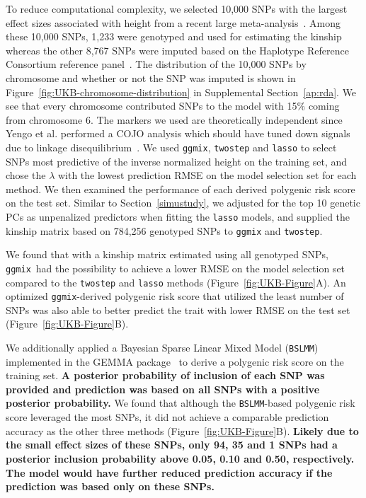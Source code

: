 \documentclass[12pt,letter]{article}\usepackage[]{graphicx}\usepackage[]{color}
\newcommand{\ggmix}{\texttt{ggmix}}
\begin{document}
To reduce computational complexity, we selected 10,000 SNPs with the largest effect sizes associated with height from a recent large meta-analysis~\citep{yengo2018meta}. Among these 10,000 SNPs, 1,233 were genotyped and used for estimating the kinship whereas the other 8,767 SNPs were imputed based on the Haplotype Reference Consortium reference panel~\citep{mccarthy2016reference}. The distribution of the 10,000 SNPs by chromosome and whether or not the SNP was imputed is shown in Figure~\ref{fig:UKB-chromosome-distribution} in Supplemental Section~\ref{ap:rda}. We see that every chromosome contributed SNPs to the model with 15\% coming from chromosome 6. The markers we used are theoretically independent since Yengo et al. performed a COJO analysis which should have tuned down signals due to linkage disequilibrium~\citep{yengo2018meta}. We used \ggmix, \texttt{twostep} and \texttt{lasso} to select SNPs most predictive of the inverse normalized height on the training set, and chose the $\lambda$ with the lowest prediction RMSE on the model selection set for each method. We then examined the performance of each derived polygenic risk score on the test set. Similar to Section~\ref{simustudy}, we adjusted for the top 10 genetic PCs as unpenalized predictors when fitting the \texttt{lasso} models, and supplied the kinship matrix based on 784,256 genotyped SNPs to \texttt{ggmix} and \texttt{twostep}.

We found that with a kinship matrix estimated using all genotyped SNPs, \ggmix ~had the possibility to achieve a lower RMSE on the model selection set compared to the \texttt{twostep} and \texttt{lasso} methods (Figure~\ref{fig:UKB-Figure}A). An optimized \ggmix-derived polygenic risk score that utilized the least number of SNPs was also able to better predict the trait with lower RMSE on the test set (Figure~\ref{fig:UKB-Figure}B).

We additionally applied a Bayesian Sparse Linear Mixed Model (\texttt{BSLMM})~\citep{zhou2013polygenic} implemented in the GEMMA package~\citep{zhou2012genome} to derive a polygenic risk score on the training set. \textbf{A posterior probability of inclusion of each SNP was provided and prediction was based on all SNPs with a positive posterior probability.} We found that although the \texttt{BSLMM}-based polygenic risk score leveraged the most SNPs, it did not achieve a comparable prediction accuracy as the other three methods (Figure~\ref{fig:UKB-Figure}B). \textbf{Likely due to the small effect sizes of these SNPs, only 94, 35 and 1 SNPs had a posterior inclusion probability above 0.05, 0.10 and 0.50, respectively. The model would have further reduced prediction accuracy if the prediction was based only on these SNPs.}
\end{document}
